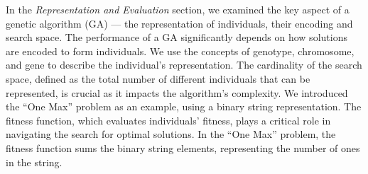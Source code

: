   In the \emph{Representation and Evaluation} section, we examined the key aspect of a genetic 
  algorithm (GA) — the representation of individuals, their encoding and search space.
  The performance of a GA significantly depends on how solutions are encoded to form individuals.
  We use the concepts of genotype, chromosome, and gene to describe the individual's representation.
  The cardinality of the search space, defined as the total number of different individuals that can
  be represented, is crucial as it impacts the algorithm's complexity.
  We introduced the \enquote{One Max} problem as an example, using a binary string representation.
  The fitness function, which evaluates individuals' fitness, plays a critical role in navigating 
  the search for optimal solutions.
  In the \enquote{One Max} problem, the fitness function sums the binary string elements, 
  representing the number of ones in the string.
